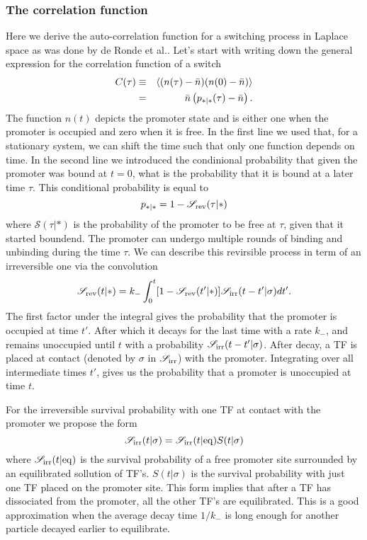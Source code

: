 \subsubsection{The correlation function}
Here we derive the auto-correlation function for a switching process in Laplace space as was done by de Ronde et al.\cite{DeRonde2012}. Let's start with writing down the general expression for the correlation function of a switch
\begin{eqnarray}
 C(\tau) & \equiv & \left\langle (n(\tau) - \bar{n})(n(0) - \bar{n}) \right\rangle \\
  	& = & \bar{n} \left( p_{*|*}(\tau)-\bar{n} \right).
 \elabel{corr_func}
\end{eqnarray}
The function $n(t)$ depicts the promoter state and is either one when the promoter is occupied and zero when it is free. In the first line we used that, for a stationary system, we can shift the time such that only one function depends on time. In the second line we introduced the condinional probability that given the promoter was bound at $t=0$, what is the probability that it is bound at a later time $\tau$. This conditional probability is equal to
\begin{equation}
 p_{*|*} = 1 - \mathscr{S}_{\rm rev}(\tau|*)
\end{equation}
where $\mathscr{S}(\tau|*)$ is the probability of the promoter to be free at $\tau$, given that it started boundend. The promoter can undergo multiple rounds of binding and unbinding during the time $\tau$. We can describe this revirsible process in term of an irreversible one via the convolution \cite{Agmon1990}
\begin{equation}
 \mathscr{S}_{\rm rev}(t|*) = k_- \int_0^t [1-\mathscr{S}_{\rm rev}(t'|*)]\mathscr{S}_{\rm irr}(t-t'|\sigma)dt'.
 \elabel{rev_conv}
\end{equation}
The first factor under the integral gives the probability that the promoter is occupied at time $t'$. After which it decays for the last time with a rate $k_-$, and remains unoccupied until $t$ with a probability $\mathscr{S}_{\rm irr}(t-t'|\sigma)$. After decay, a TF is placed at contact (denoted by $\sigma$ in $\mathscr{S}_{\rm irr}$) with the promoter. Integrating over all intermediate times $t'$, gives us the probability that a promoter is unoccupied at time $t$. 

For the irreversible survival probability with one TF at contact with the promoter we propose the form
\begin{equation}
 \mathscr{S}_{\rm irr}(t|\sigma) = \mathscr{S}_{\rm irr}(t|{\rm eq}) S(t|\sigma)
 \elabel{Def_Ssi}
\end{equation}
where $\mathscr{S}_{\rm irr}(t|{\rm eq})$ is the survival probability of a free promoter site surrounded by an equilibrated sollution of TF's. $S(t|\sigma)$ is the survival probability with just one TF placed on the promoter site. This form implies that after a TF has dissociated from the promoter, all the other TF's are equilibrated. This is a good approximation when the average decay time $1/k_-$ is long enough for another particle decayed earlier to equilibrate. 

